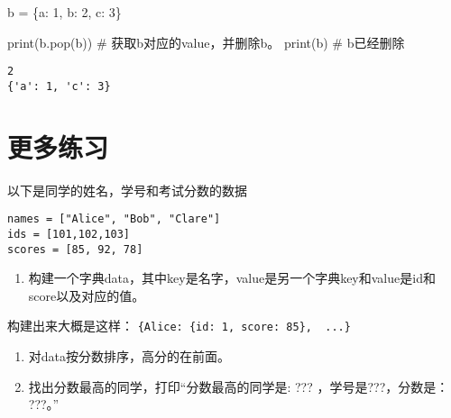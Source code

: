 \documentclass[
  letterpaper,
  DIV=11,
  numbers=noendperiod]{scrreprt}
\newenvironment{Shaded}{\begin{snugshade}}{\end{snugshade}}
\newcommand{\BuiltInTok}[1]{\textcolor[rgb]{0.00,0.23,0.31}{#1}}
\newcommand{\CommentTok}[1]{\textcolor[rgb]{0.37,0.37,0.37}{#1}}
\newcommand{\DecValTok}[1]{\textcolor[rgb]{0.68,0.00,0.00}{#1}}
\newcommand{\NormalTok}[1]{\textcolor[rgb]{0.00,0.23,0.31}{#1}}
\newcommand{\OperatorTok}[1]{\textcolor[rgb]{0.37,0.37,0.37}{#1}}
\newcommand{\StringTok}[1]{\textcolor[rgb]{0.13,0.47,0.30}{#1}}
\providecommand{\tightlist}{%
  \setlength{\itemsep}{0pt}\setlength{\parskip}{0pt}}\usepackage{longtable,booktabs,array}
\begin{document}
\begin{Shaded}
\begin{Highlighting}[]
\NormalTok{b }\OperatorTok{=}\NormalTok{ \{}\StringTok{\textquotesingle{}a\textquotesingle{}}\NormalTok{: }\DecValTok{1}\NormalTok{, }\StringTok{\textquotesingle{}b\textquotesingle{}}\NormalTok{: }\DecValTok{2}\NormalTok{, }\StringTok{\textquotesingle{}c\textquotesingle{}}\NormalTok{: }\DecValTok{3}\NormalTok{\}}

\BuiltInTok{print}\NormalTok{(b.pop(}\StringTok{\textquotesingle{}b\textquotesingle{}}\NormalTok{)) }\CommentTok{\# 获取\textquotesingle{}b\textquotesingle{}对应的value，并删除\textquotesingle{}b\textquotesingle{}。}
\BuiltInTok{print}\NormalTok{(b) }\CommentTok{\# \textquotesingle{}b\textquotesingle{}已经删除}
\end{Highlighting}
\end{Shaded}

\begin{verbatim}
2
{'a': 1, 'c': 3}
\end{verbatim}

\hypertarget{ux66f4ux591aux7ec3ux4e60-1}{%
\section{更多练习}\label{ux66f4ux591aux7ec3ux4e60-1}}

以下是同学的姓名，学号和考试分数的数据

\begin{verbatim}
names = ["Alice", "Bob", "Clare"]
ids = [101,102,103]
scores = [85, 92, 78]
\end{verbatim}

\begin{enumerate}
\def\labelenumi{\arabic{enumi}.}
\tightlist
\item
  构建一个字典data，其中key是名字，value是另一个字典key和value是id和score以及对应的值。
\end{enumerate}

构建出来大概是这样：
\texttt{\{\textquotesingle{}Alice\textquotesingle{}:\ \{\textquotesingle{}id\textquotesingle{}:\ 1,\ \textquotesingle{}score\textquotesingle{}:\ 85\},\ \ ...\}}

\begin{enumerate}
\def\labelenumi{\arabic{enumi}.}
\setcounter{enumi}{1}
\item
  对data按分数排序，高分的在前面。
\item
  找出分数最高的同学，打印``分数最高的同学是: ??? ，学号是???，分数是：
  ???。''
\end{enumerate}
\end{document}

